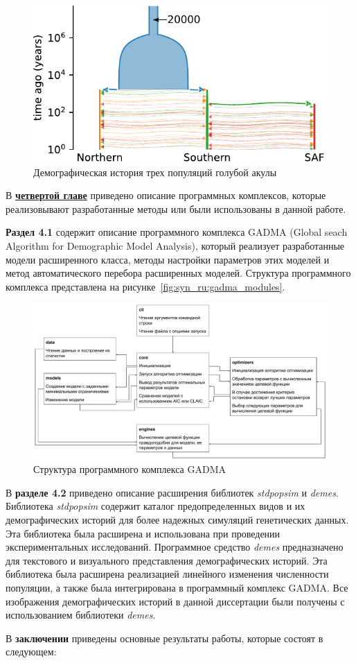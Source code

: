 \begin{figure}[ht]
    \centering
        \includegraphics[width=0.6\linewidth]{images_experiments/blue_shark/3pop_history.pdf}
    \caption{Демографическая история трех популяций голубой акулы}
\end{figure}

В \underline{\textbf{четвертой главе}} приведено описание программных комплексов, которые реализовывают разработанные методы или были использованы в данной работе. 

\textbf{Раздел 4.1} содержит описание программного комплекса GADMA (Global seach Algorithm for Demographic Model Analysis), который реализует разработанные модели расширенного класса, методы настройки параметров этих моделей и метод автоматического перебора расширенных моделей.
Структура программного комплекса представлена на рисунке~\ref{fig:syn_ru:gadma_modules}.

\begin{figure}[ht]
    \centering
    \includegraphics[width=\linewidth]{images/part5/gadma_modules.pdf}
    \caption{Структура программного комплекса GADMA}
\end{figure}

В \textbf{разделе 4.2} приведено описание расширения библиотек \textit{stdpopsim} и \textit{demes}.
Библиотека \textit{stdpopsim} содержит каталог предопределенных видов и их демографических историй для более надежных симуляций генетических данных.
Эта библиотека была расширена и использована при проведении экспериментальных исследований.
Программное средство \textit{demes} предназначено для текстового и визуального представления демографических историй.
Эта библиотека была расширена реализацией линейного изменения численности популяции, а также была интегрирована в программный комплекс GADMA.
Все изображения демографических историй в данной диссертации были получены с использованием библиотеки \textit{demes}.

В \textbf{заключении} приведены основные результаты работы, которые состоят в следующем:
